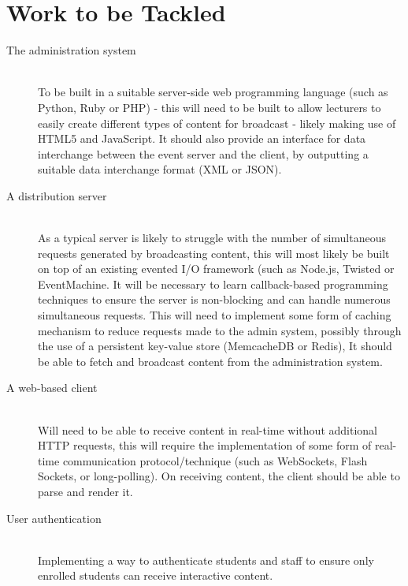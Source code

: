 \documentclass[a4papert,11pt,notitlepage]{ltxdoc}
\begin{document}
\section{Work to be Tackled}
\begin{description}
\item[The administration system] \hfill \\
To be built in a suitable server-side web programming language (such as Python\cite{python:website}, Ruby\cite{ruby:website} or PHP\cite{php:website}) - this will need to be built to allow lecturers to easily create different types of content for broadcast - likely making use of HTML5\cite{html5:website} and JavaScript\cite{javascript:website}. It should also provide an interface for data interchange between the event server and the client, by outputting a suitable data interchange format (XML\cite{xml:website} or JSON\cite{json:website}).
\item[A distribution server] \hfill \\
As a typical server is likely to struggle with the number of simultaneous requests generated by broadcasting content, this will most likely be built on top of an existing evented I/O framework (such as Node.js\cite{nodejs:website}, Twisted\cite{twisted:website} or EventMachine\cite{eventmachine:website}. It will be necessary to learn callback-based programming techniques to ensure the server is non-blocking and can handle numerous simultaneous requests. This will need to implement some form of caching mechanism to reduce requests made to the admin system, possibly through the use of a persistent key-value store (MemcacheDB\cite{memcachedb:website} or Redis\cite{redis:website}), It should be able to fetch and broadcast content from the administration system.
\item[A web-based client] \hfill \\
Will need to be able to receive content in real-time without additional HTTP requests, this will require the implementation of some form of real-time communication protocol/technique (such as WebSockets\cite{websockets:website}, Flash Sockets, or long-polling). On receiving content, the client should be able to parse and render it.
\item[User authentication] \hfill \\
Implementing a way to authenticate students and staff to ensure only enrolled students can receive interactive content.
\end{description}
\end{document}
